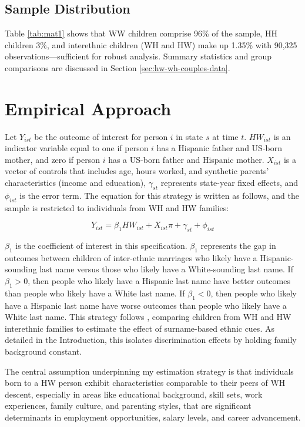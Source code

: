 \subsection{Sample Distribution}
Table \ref{tab:mat1} shows that WW children comprise 96\% of the sample, HH children 3\%, and interethnic children (WH and HW) make up 1.35\% with 90,325 observations—sufficient for robust analysis. Summary statistics and group comparisons are discussed in Section \ref{sec:hw-wh-couples-data}.

\section{Empirical Approach}\label{sec:emp_model}

Let $Y_{ist}$ be the outcome of interest for person $i$ in state $s$ at time $t$. $HW_{ist}$ is an indicator variable equal to one if person $i$ has a Hispanic father and US-born mother, and zero if person $i$ has a US-born father and Hispanic mother. $X_{ist}$ is a vector of controls that includes age, hours worked, and synthetic parents' characteristics (income and education), $\gamma_{st}$ represents state-year fixed effects, and $\phi_{ist}$ is the error term. The equation for this strategy is written as follows, and the sample is restricted to individuals from WH and HW families:

\begin{equation} \label{eq:1a}
Y_{ist} = \beta_{1} HW_{ist} + X_{ist} \pi + \gamma_{st} + \phi_{ist}
\end{equation}

$\beta_{1}$ is the coefficient of interest in this specification. $\beta_{1}$ represents the gap in outcomes between children of inter-ethnic marriages who likely have a Hispanic-sounding last name versus those who likely have a White-sounding last name. If $\beta_{1} > 0$, then people who likely have a Hispanic last name have better outcomes than people who likely have a White last name. If $\beta_{1} < 0$, then people who likely have a Hispanic last name have worse outcomes than people who likely have a White last name. This strategy follows \textcite{rubinstein2014pride}, comparing children from WH and HW interethnic families to estimate the effect of surname-based ethnic cues. As detailed in the Introduction, this isolates discrimination effects by holding family background constant.

The central assumption underpinning my estimation strategy is that individuals born to a HW person exhibit characteristics comparable to their peers of WH descent, especially in areas like educational background, skill sets, work experiences, family culture, and parenting styles, that are significant determinants in employment opportunities, salary levels, and career advancement.

